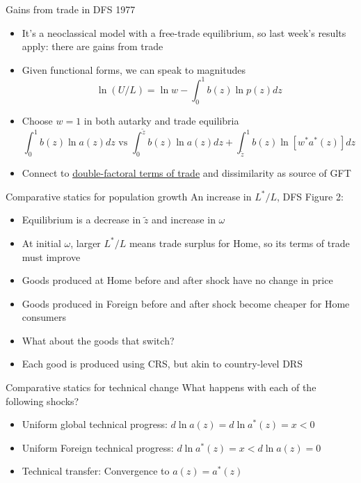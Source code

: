 \documentclass[10pt,notes=hide]{beamer}
\begin{document}
\begin{frame}{Gains from trade in DFS 1977}
\begin{itemize}
	\item It's a neoclassical model with a free-trade equilibrium,
	so last week's results apply: there are gains from trade
	\item Given functional forms, we can speak to magnitudes
	\begin{equation*}
		\ln (U/L) = {\ln w} - \int_{0}^{1} b(z) \ln p(z) dz
	\end{equation*}
	\item Choose $w=1$ in both autarky and trade equilibria
	\begin{equation*}
	 \int_{0}^{1} b(z) \ln a(z) dz \text{ vs } \int_{0}^{\tilde{z}} b(z) \ln a(z) dz + \int_{\tilde{z}}^{1} b(z) \ln \left[w^{*} a^{*}(z)\right] dz 
	\end{equation*}
	\item Connect to \href{http://www-personal.umich.edu/~alandear/glossary/d.html\#DoubleFactoralTermsOfTrade}{double-factoral terms of trade} and dissimilarity as source of GFT
\end{itemize}
\end{frame}
\begin{frame}{Comparative statics for population growth}
An increase in $L^{*}/L$, DFS Figure 2:
\begin{itemize}
	\item Equilibrium is a decrease in $\tilde{z}$ and increase in $\omega$
	\item At initial $\omega$, larger $L^{*}/L$ means trade surplus for Home, so its terms of trade must improve
	\item Goods produced at Home before and after shock have no change in price
	\item Goods produced in Foreign before and after shock become cheaper for Home consumers
	\item What about the goods that switch?
	\item Each good is produced using CRS, but akin to country-level DRS
\end{itemize}
\end{frame}
\begin{frame}{Comparative statics for technical change}
What happens with each of the following shocks?
\begin{itemize}
	\item Uniform global technical progress:  $d\ln a(z) = d\ln a^{*}(z) = x < 0$
	\item Uniform Foreign technical progress: $d\ln a^{*}(z) = x < d\ln a(z) = 0$
	\item Technical transfer: Convergence to $a(z) = a^{*}(z)$
\end{itemize}
\end{frame}
\end{document}

